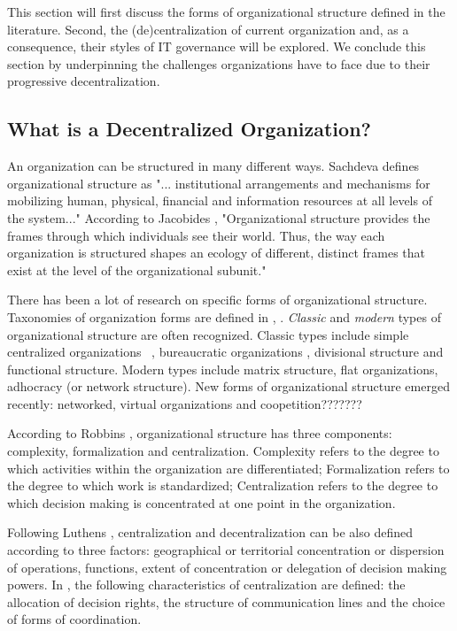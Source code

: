 This section will first discuss the forms of organizational structure defined in the literature. Second, the (de)centralization of current organization and, as a consequence, their styles of IT governance will be explored. We conclude this section by underpinning the challenges organizations have to face due to their progressive decentralization.

\subsection{What is a Decentralized Organization?} 
 
An organization can be structured in many different ways. Sachdeva \cite{sachdeva1990} defines organizational structure as "... institutional arrangements and mechanisms for mobilizing human, physical, financial and information resources at all levels of the system..." According to Jacobides \cite{jacobides2007}, "Organizational structure provides the frames through which individuals see their world. Thus, the way each organization is structured shapes an ecology of different, distinct frames that exist at the level of the organizational subunit." 

There has been a lot of research on specific forms of organizational structure. Taxonomies of organization forms are defined in  \cite{mckelvey1982}, \cite{rich1992}.   \textit{Classic} and \textit{modern} types of organizational structure are often recognized.  Classic types include simple centralized organizations ~\cite{Mintzberg1979}, bureaucratic organizations \cite{minzberg81}, divisional structure and functional structure. Modern  types include matrix structure, flat organizations, adhocracy (or network structure). New forms of organizational structure emerged recently: networked, virtual organizations and coopetition???????

According to Robbins \cite{robbins1997}, organizational structure has three components: complexity, formalization and centralization.  Complexity refers to the degree to which activities within the organization are differentiated; Formalization refers to the degree to which work is standardized; Centralization refers to the degree to which decision making is concentrated at one point in the organization. 

Following Luthens \cite{luthans2006}, centralization and decentralization can be also defined according to three factors:  geographical or territorial concentration or dispersion of operations, functions,  extent of concentration or delegation of decision making powers. In \cite{pearlson2009},  the following characteristics of centralization are defined: the allocation of decision rights,  the structure of communication lines and  the choice of forms of coordination.

